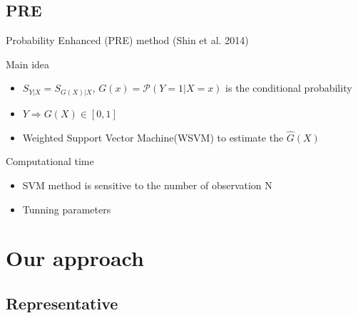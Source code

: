 \documentclass[ignorenonframetext,]{beamer}
\providecommand{\tightlist}{%
  \setlength{\itemsep}{0pt}\setlength{\parskip}{0pt}}
\begin{document}
\subsection{PRE}\label{pre}

\begin{frame}{Probability Enhanced (PRE) method (Shin et al. 2014)}

\begin{block}{Main idea}

\begin{itemize}
\tightlist
\item
  \(S_{Y|X} = S_{G(X)|X}\), \(G(x) = \mathcal{P}(Y = 1|X = x)\) is the
  conditional probability
\item
  \(Y \Rightarrow G(X) \in [0,1]\)
\item
  Weighted Support Vector Machine(WSVM) to estimate the \(\hat{G}(X)\)
\end{itemize}

\end{block}

\begin{block}{Computational time}

\begin{itemize}
\tightlist
\item
  SVM method is sensitive to the number of observation N
\item
  Tunning parameters
\end{itemize}

\end{block}

\end{frame}

\section{Our approach}\label{our-approach}

\subsection{Representative}\label{representative}
\end{document}
